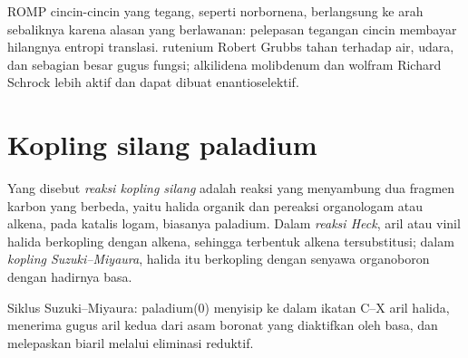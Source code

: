ROMP cincin-cincin yang tegang, seperti norbornena, berlangsung ke arah sebaliknya karena alasan
yang berlawanan: pelepasan tegangan cincin membayar hilangnya entropi translasi.
 rutenium Robert Grubbs tahan terhadap air, udara, dan sebagian besar gugus
fungsi; alkilidena molibdenum dan wolfram Richard Schrock lebih aktif
dan dapat dibuat enantioselektif.

\section{Kopling silang paladium}

\begin{definition}\label{def:b3:homogeneous-catalysis:cross-coupling}
Yang disebut \emph{reaksi kopling silang} adalah reaksi yang menyambung dua
fragmen karbon yang berbeda, yaitu halida organik dan pereaksi organologam atau
alkena, pada katalis logam, biasanya paladium. Dalam \emph{reaksi
Heck}, aril atau vinil halida berkopling dengan alkena,
sehingga terbentuk alkena tersubstitusi; dalam \emph{kopling
Suzuki--Miyaura}, halida itu berkopling dengan senyawa
organoboron dengan hadirnya basa.
\end{definition}

\begin{omfigure}

{\small Siklus Suzuki--Miyaura: paladium(0) menyisip ke dalam ikatan C--X
aril halida, menerima gugus aril kedua dari asam boronat yang diaktifkan oleh
basa, dan melepaskan biaril melalui eliminasi reduktif.}
\end{omfigure}


